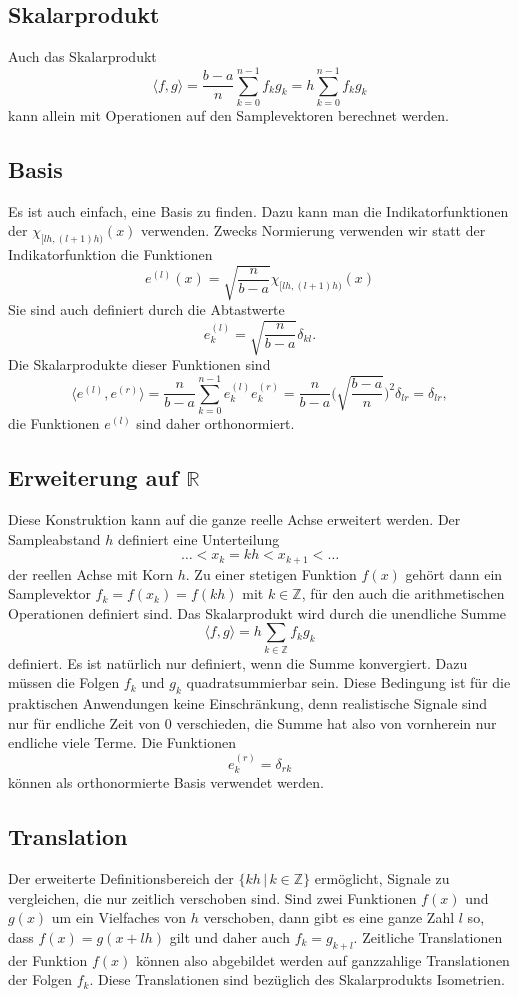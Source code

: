 \subsection{Skalarprodukt
\label{haar:subsection:skalarprodukt}}
Auch das Skalarprodukt 
\[
\langle f,g\rangle
=
\frac{b-a}{n}
\sum_{k=0}^{n-1} f_k g_k
=
h
\sum_{k=0}^{n-1} f_k g_k
\]
kann allein mit Operationen auf den Samplevektoren berechnet werden.

\subsection{Basis
\label{haar:subsection:basis}}
Es ist auch einfach, eine Basis zu finden.
Dazu kann man die Indikatorfunktionen der $\chi_{[lh,(l+1)h)}(x)$
verwenden.
Zwecks Normierung verwenden wir statt der Indikatorfunktion die
Funktionen
\[
e^{(l)}(x) = \sqrt{\frac{n}{b-a}}\chi_{[lh,(l+1)h)}(x)
\]
Sie sind auch definiert durch die Abtastwerte
\[
e_k^{(l)} = \sqrt{\frac{n}{b-a}}\delta_{kl}.
\]
Die Skalarprodukte dieser Funktionen sind
\[
\langle e^{(l)}, e^{(r)}\rangle
=
\frac{n}{b-a}
\sum_{k=0}^{n-1} e^{(l)}_k e^{(r)}_k
=
\frac{n}{b-a}
\biggl(\sqrt{\frac{b-a}{n}}\biggr)^2 \delta_{lr}
=
\delta_{lr},
\]
die Funktionen $e^{(l)}$ sind daher orthonormiert.

\subsection{Erweiterung auf $\mathbb R$}
Diese Konstruktion kann auf die ganze reelle Achse erweitert werden.
Der Sampleabstand $h$ definiert eine Unterteilung
\[
\dots < x_{k} = kh < x_{k+1} < \dots
\]
der reellen Achse mit Korn $h$.
Zu einer stetigen Funktion $f(x)$ gehört dann ein Samplevektor
$f_k=f(x_k)=f(kh)$ mit $k\in\mathbb Z$, für den auch die
arithmetischen Operationen definiert sind.
Das Skalarprodukt wird durch die unendliche Summe
\[
\langle f, g\rangle
=
h
\sum_{k\in\mathbb Z} f_k g_k
\]
definiert.
Es ist natürlich nur definiert, wenn die Summe konvergiert.
Dazu müssen die Folgen $f_k$ und $g_k$ quadratsummierbar sein.
Diese Bedingung ist für die praktischen Anwendungen keine Einschränkung,
denn realistische Signale sind nur für endliche Zeit von $0$ verschieden,
die Summe hat also von vornherein nur endliche viele Terme.
Die Funktionen
\[
e^{(r)}_k = \delta_{rk}
\]
können als orthonormierte Basis verwendet werden.

\subsection{Translation
\label{haar:subsection:translation}}
Der erweiterte Definitionsbereich der $\{kh\,|\,k\in\mathbb Z\}$ ermöglicht,
Signale zu vergleichen, die nur zeitlich verschoben sind.
Sind zwei Funktionen $f(x)$ und $g(x)$ um ein Vielfaches von $h$ verschoben,
dann gibt es eine ganze Zahl $l$ so, dass $f(x)=g(x+lh)$ gilt und daher auch
$f_k = g_{k+l}$.
Zeitliche Translationen der Funktion $f(x)$ können also abgebildet
werden auf ganzzahlige Translationen der Folgen $f_k$.
Diese Translationen sind bezüglich des Skalarprodukts Isometrien.

